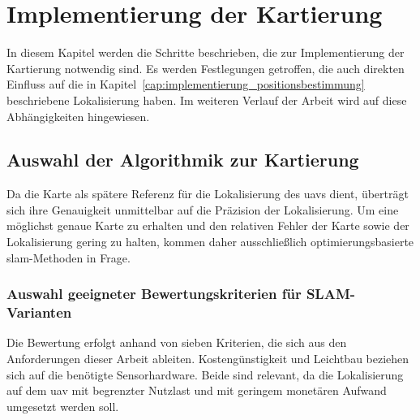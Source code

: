 
%
%
%
%
%





\chapter{Implementierung der Kartierung}
\label{cap:implementierung_kartierung}
In diesem Kapitel werden die Schritte beschrieben, die zur Implementierung der Kartierung notwendig sind.
Es werden Festlegungen getroffen, die auch direkten Einfluss auf die in Kapitel~\ref{cap:implementierung_positionsbestimmung} beschriebene Lokalisierung haben.
Im weiteren Verlauf der Arbeit wird auf diese Abhängigkeiten hingewiesen.

\section{Auswahl der Algorithmik zur Kartierung}
Da die Karte als spätere Referenz für die Lokalisierung des \gls{uav}s dient, überträgt sich ihre Genauigkeit unmittelbar auf die Präzision der Lokalisierung.
Um eine möglichst genaue Karte zu erhalten und den relativen Fehler der Karte sowie der Lokalisierung gering zu halten, 
kommen daher ausschließlich optimierungsbasierte \gls{slam}-Methoden in Frage.


\subsection*{Auswahl geeigneter Bewertungskriterien für SLAM-Varianten}
Die Bewertung erfolgt anhand von sieben Kriterien, die sich aus den Anforderungen dieser Arbeit ableiten.
Kostengünstigkeit und Leichtbau beziehen sich auf die benötigte Sensorhardware.
Beide sind relevant, da die Lokalisierung auf dem \gls{uav} mit begrenzter Nutzlast und mit geringem monetären Aufwand umgesetzt werden soll.

